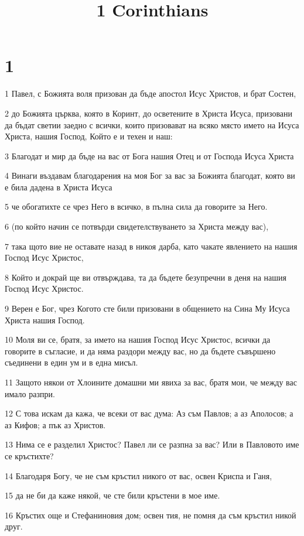 

\title{1 Corinthians}


\chapter{1}

\par 1 Павел, с Божията воля призован да бъде апостол Исус Христов, и брат Состен,
\par 2 до Божията църква, която в Коринт, до осветените в Христа Исуса, призовани да бъдат светии заедно с всички, които призовават на всяко място името на Исуса Христа, нашия Господ, Който е и техен и наш:
\par 3 Благодат и мир да бъде на вас от Бога нашия Отец и от Господа Исуса Христа
\par 4 Винаги въздавам благодарения на моя Бог за вас за Божията благодат, която ви е била дадена в Христа Исуса
\par 5 че обогатихте се чрез Него в всичко, в пълна сила да говорите за Него.
\par 6 (по който начин се потвърди свидетелствуването за Христа между вас),
\par 7 така щото вие не оставате назад в никоя дарба, като чакате явлението на нашия Господ Исус Христос,
\par 8 Който и докрай ще ви отвърждава, та да бъдете безупречни в деня на нашия Господ Исус Христос.
\par 9 Верен е Бог, чрез Когото сте били призовани в общението на Сина Му Исуса Христа нашия Господ.
\par 10 Моля ви се, братя, за името на нашия Господ Исус Христос, всички да говорите в съгласие, и да няма раздори между вас, но да бъдете съвършено съединени в един ум и в една мисъл.
\par 11 Защото някои от Хлоините домашни ми явиха за вас, братя мои, че между вас имало разпри.
\par 12 С това искам да кажа, че всеки от вас дума: Аз съм Павлов; а аз Аполосов; а аз Кифов; а пък аз Христов.
\par 13 Нима се е разделил Христос? Павел ли се разпна за вас? Или в Павловото име се кръстихте?
\par 14 Благодаря Богу, че не съм кръстил никого от вас, освен Криспа и Ганя,
\par 15 да не би да каже някой, че сте били кръстени в мое име.
\par 16 Кръстих още и Стефаниновия дом; освен тия, не помня да съм кръстил никой друг.

